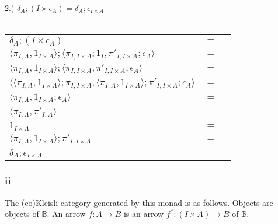 \documentclass{article}
\begin{document}
\\~\\~\\
2.) $\delta_A;(I \times \epsilon_A) = \delta_{A};\epsilon_{I \times A}$\\~\\
\begin{tabular}{lll}
$\delta_A;(I \times \epsilon_A)$ & $=$ & \\
$\langle \pi_{I,A}, 1_{I \times A}\rangle; \langle \pi_{I,I \times A};1_I, \pi'_{I,I \times A};\epsilon_A \rangle$ & $=$ & \\
$\langle \pi_{I,A}, 1_{I \times A}\rangle; \langle \pi_{I,I \times A}, \pi'_{I,I \times A};\epsilon_A \rangle$ & $=$ & \\
$\langle \langle \pi_{I,A}, 1_{I \times A}\rangle;\pi_{I,I \times A}, \langle \pi_{I,A}, 1_{I \times A}\rangle;\pi'_{I,I \times A};\epsilon_A \rangle$ & $=$ & \\
$\langle \pi_{I,A}, 1_{I \times A};\epsilon_A \rangle$ & $=$ & \\
$\langle \pi_{I,A}, \pi'_{I,A} \rangle$ & $=$ & \\
$1_{I \times A}$ & $=$ & \\
$\langle \pi_{I,A}, 1_{I \times A} \rangle;\pi'_{I,I \times A} $ & $=$ & \\
$\delta_A;\epsilon_{I \times A}$ & &
\end{tabular}

\subsubsection*{ii}

The (co)Kleisli category generated by this monad is as follows. Objects are objects of $\mathbb B$.
An arrow $f : A \to B$ is an arrow $f^* : (I \times A) \to B$ of $\mathbb B$.
\end{document}
